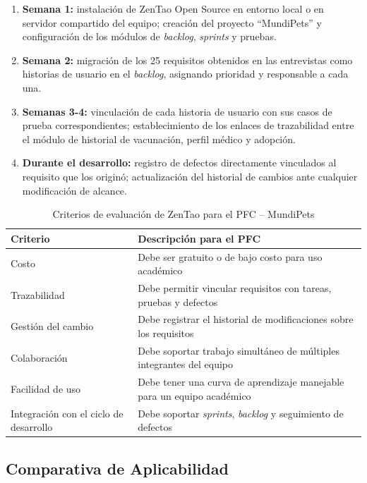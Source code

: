 \documentclass[journal,onecolumn]{IEEEtran}
\begin{document}
\begin{enumerate}
  \item \textbf{Semana 1:} instalación de ZenTao Open Source en entorno local o en servidor
  compartido del equipo; creación del proyecto ``MundiPets'' y configuración de los módulos
  de \textit{backlog}, \textit{sprints} y pruebas.
  \item \textbf{Semana 2:} migración de los 25 requisitos obtenidos en las entrevistas como
  historias de usuario en el \textit{backlog}, asignando prioridad y responsable a cada una.
  \item \textbf{Semanas 3-4:} vinculación de cada historia de usuario con sus casos de prueba
  correspondientes; establecimiento de los enlaces de trazabilidad entre el módulo de historial
  de vacunación, perfil médico y adopción.
  \item \textbf{Durante el desarrollo:} registro de defectos directamente vinculados al requisito
  que los originó; actualización del historial de cambios ante cualquier modificación de alcance.
\end{enumerate}



\begin{table}[H]
	\caption{Criterios de evaluación de ZenTao para el PFC -- MundiPets}
	\label{tab:criterios}
	\begin{tabularx}{\textwidth}{|l|X|}
		\hline
		\textbf{Criterio} & \textbf{Descripción para el PFC} \\
		\hline
		Costo & Debe ser gratuito o de bajo costo para uso académico \\
		\hline
		Trazabilidad & Debe permitir vincular requisitos con tareas, pruebas y defectos \\
		\hline
		Gestión del cambio & Debe registrar el historial de modificaciones sobre los requisitos \\
		\hline
		Colaboración & Debe soportar trabajo simultáneo de múltiples integrantes del equipo \\
		\hline
		Facilidad de uso & Debe tener una curva de aprendizaje manejable para un equipo académico \\
		\hline
		Integración con el ciclo de desarrollo & Debe soportar \textit{sprints}, \textit{backlog} y seguimiento de defectos \\
		\hline
	\end{tabularx}
\end{table}

\subsection{Comparativa de Aplicabilidad}
\end{document}
